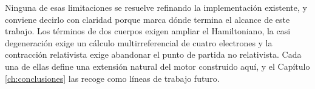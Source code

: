Ninguna de esas limitaciones se resuelve refinando la implementación existente, y conviene decirlo con claridad porque marca dónde termina el alcance de este trabajo. Los términos de dos cuerpos exigen ampliar el Hamiltoniano, la casi degeneración exige un cálculo multirreferencial de cuatro electrones y la contracción relativista exige abandonar el punto de partida no relativista. Cada una de ellas define una extensión natural del motor construido aquí, y el Capítulo \ref{ch:conclusiones} las recoge como líneas de trabajo futuro.

